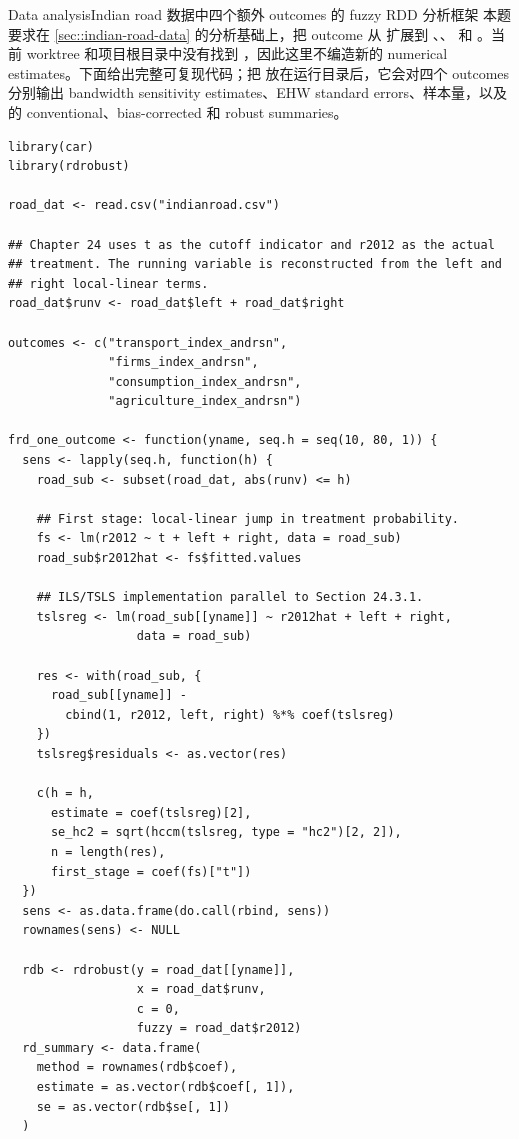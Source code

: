 \begin{exercisesolution}{Data analysis}{Indian road 数据中四个额外 outcomes 的 fuzzy RDD 分析框架}
本题要求在 \cref{sec::indian-road-data} 的分析基础上，把 outcome 从  扩展到 、、 和 。当前 worktree 和项目根目录中没有找到 ，因此这里不编造新的 numerical estimates。下面给出完整可复现代码；把  放在运行目录后，它会对四个 outcomes 分别输出 bandwidth sensitivity estimates、EHW standard errors、样本量，以及  的 conventional、bias-corrected 和 robust summaries。

\begin{lstlisting}
library(car)
library(rdrobust)

road_dat <- read.csv("indianroad.csv")

## Chapter 24 uses t as the cutoff indicator and r2012 as the actual
## treatment. The running variable is reconstructed from the left and
## right local-linear terms.
road_dat$runv <- road_dat$left + road_dat$right

outcomes <- c("transport_index_andrsn",
              "firms_index_andrsn",
              "consumption_index_andrsn",
              "agriculture_index_andrsn")

frd_one_outcome <- function(yname, seq.h = seq(10, 80, 1)) {
  sens <- lapply(seq.h, function(h) {
    road_sub <- subset(road_dat, abs(runv) <= h)

    ## First stage: local-linear jump in treatment probability.
    fs <- lm(r2012 ~ t + left + right, data = road_sub)
    road_sub$r2012hat <- fs$fitted.values

    ## ILS/TSLS implementation parallel to Section 24.3.1.
    tslsreg <- lm(road_sub[[yname]] ~ r2012hat + left + right,
                  data = road_sub)

    res <- with(road_sub, {
      road_sub[[yname]] -
        cbind(1, r2012, left, right) %*% coef(tslsreg)
    })
    tslsreg$residuals <- as.vector(res)

    c(h = h,
      estimate = coef(tslsreg)[2],
      se_hc2 = sqrt(hccm(tslsreg, type = "hc2")[2, 2]),
      n = length(res),
      first_stage = coef(fs)["t"])
  })
  sens <- as.data.frame(do.call(rbind, sens))
  rownames(sens) <- NULL

  rdb <- rdrobust(y = road_dat[[yname]],
                  x = road_dat$runv,
                  c = 0,
                  fuzzy = road_dat$r2012)
  rd_summary <- data.frame(
    method = rownames(rdb$coef),
    estimate = as.vector(rdb$coef[, 1]),
    se = as.vector(rdb$se[, 1])
  )


\end{lstlisting}
\end{exercisesolution}
